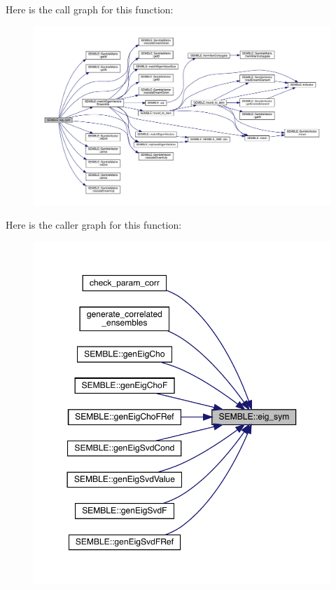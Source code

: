 Here is the call graph for this function\+:
\nopagebreak
\begin{figure}[H]
\begin{center}
\leavevmode
\includegraphics[width=350pt]{d7/dfd/namespaceSEMBLE_a302bd8012ba286b83aeff7e786f8294e_cgraph}
\end{center}
\end{figure}
Here is the caller graph for this function\+:
\nopagebreak
\begin{figure}[H]
\begin{center}
\leavevmode
\includegraphics[width=350pt]{d7/dfd/namespaceSEMBLE_a302bd8012ba286b83aeff7e786f8294e_icgraph}
\end{center}
\end{figure}
\mbox{\label{namespaceSEMBLE_a0c3011d7bbdc3f7abab3fda010549fa6}} 
